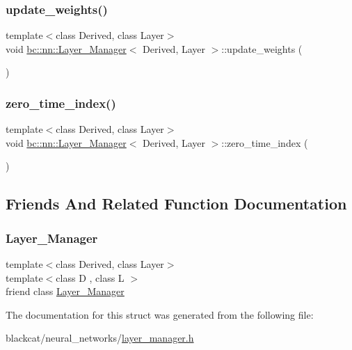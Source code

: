 \subsubsection{\texorpdfstring{update\+\_\+weights()}{update\_weights()}}
{\footnotesize\ttfamily template$<$class Derived, class Layer$>$ \\
void \hyperlink{structbc_1_1nn_1_1Layer__Manager}{bc\+::nn\+::\+Layer\+\_\+\+Manager}$<$ Derived, Layer $>$\+::update\+\_\+weights (\begin{DoxyParamCaption}{ }\end{DoxyParamCaption})\hspace{0.3cm}{\ttfamily [inline]}}

\mbox{\label{structbc_1_1nn_1_1Layer__Manager_ad0b46a663ef46dee13c2dffbd4c8b1f3}} 
\subsubsection{\texorpdfstring{zero\+\_\+time\+\_\+index()}{zero\_time\_index()}}
{\footnotesize\ttfamily template$<$class Derived, class Layer$>$ \\
void \hyperlink{structbc_1_1nn_1_1Layer__Manager}{bc\+::nn\+::\+Layer\+\_\+\+Manager}$<$ Derived, Layer $>$\+::zero\+\_\+time\+\_\+index (\begin{DoxyParamCaption}{ }\end{DoxyParamCaption})\hspace{0.3cm}{\ttfamily [inline]}}



\subsection{Friends And Related Function Documentation}
\mbox{\label{structbc_1_1nn_1_1Layer__Manager_ad8aa8062ca6d04ccdeff27cf28c1eb4e}} 
\subsubsection{\texorpdfstring{Layer\+\_\+\+Manager}{Layer\_Manager}}
{\footnotesize\ttfamily template$<$class Derived, class Layer$>$ \\
template$<$class D , class L $>$ \\
friend class \hyperlink{structbc_1_1nn_1_1Layer__Manager}{Layer\+\_\+\+Manager}\hspace{0.3cm}{\ttfamily [friend]}}



The documentation for this struct was generated from the following file\+:\begin{DoxyCompactItemize}
\item 
blackcat/neural\+\_\+networks/\hyperlink{layer__manager_8h}{layer\+\_\+manager.\+h}\end{DoxyCompactItemize}
